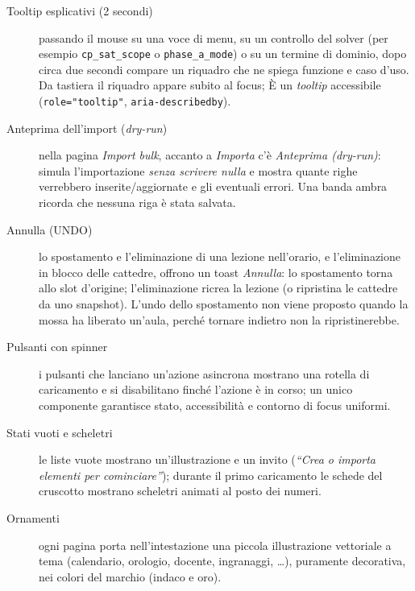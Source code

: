 \begin{description}
\item[Tooltip esplicativi (2 secondi)] passando il mouse su una voce di
  menu, su un controllo del solver (per esempio \texttt{cp\_sat\_scope} o
  \texttt{phase\_a\_mode}) o su un termine di dominio, dopo circa due secondi
  compare un riquadro che ne spiega funzione e caso d'uso. Da tastiera il
  riquadro appare subito al focus; \`E un \emph{tooltip} accessibile
  (\texttt{role="tooltip"}, \texttt{aria-describedby}).
\item[Anteprima dell'import (\emph{dry-run})] nella pagina \emph{Import bulk},
  accanto a \emph{Importa} c'\`e \emph{Anteprima (dry-run)}: simula
  l'importazione \emph{senza scrivere nulla} e mostra quante righe verrebbero
  inserite/aggiornate e gli eventuali errori. Una banda ambra ricorda che
  nessuna riga \`e stata salvata.
\item[Annulla (UNDO)] lo spostamento e l'eliminazione di una lezione
  nell'orario, e l'eliminazione in blocco delle cattedre, offrono un toast
  \emph{Annulla}: lo spostamento torna allo slot d'origine; l'eliminazione
  ricrea la lezione (o ripristina le cattedre da uno snapshot). L'undo dello
  spostamento non viene proposto quando la mossa ha liberato un'aula, perch\'e
  tornare indietro non la ripristinerebbe.
\item[Pulsanti con spinner] i pulsanti che lanciano un'azione asincrona
  mostrano una rotella di caricamento e si disabilitano finch\'e l'azione
  \`e in corso; un unico componente garantisce stato, accessibilit\`a e
  contorno di focus uniformi.
\item[Stati vuoti e scheletri] le liste vuote mostrano un'illustrazione e un
  invito (\emph{``Crea o importa elementi per cominciare''}); durante il primo
  caricamento le schede del cruscotto mostrano scheletri animati al posto dei
  numeri.
\item[Ornamenti] ogni pagina porta nell'intestazione una piccola
  illustrazione vettoriale a tema (calendario, orologio, docente, ingranaggi,
  \dots), puramente decorativa, nei colori del marchio (indaco e oro).
\end{description}
